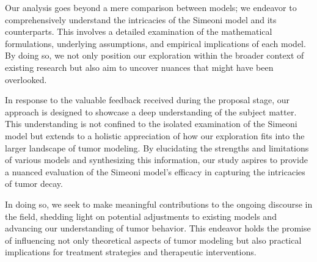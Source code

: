 \documentclass[11pt]{amsart}
\begin{document}
Our analysis goes beyond a mere comparison between models; we endeavor to comprehensively understand the intricacies of the Simeoni model and its counterparts. This involves a detailed examination of the mathematical formulations, underlying assumptions, and empirical implications of each model. By doing so, we not only position our exploration within the broader context of existing research but also aim to uncover nuances that might have been overlooked.

In response to the valuable feedback received during the proposal stage, our approach is designed to showcase a deep understanding of the subject matter. This understanding is not confined to the isolated examination of the Simeoni model but extends to a holistic appreciation of how our exploration fits into the larger landscape of tumor modeling. By elucidating the strengths and limitations of various models and synthesizing this information, our study aspires to provide a nuanced evaluation of the Simeoni model's efficacy in capturing the intricacies of tumor decay.

In doing so, we seek to make meaningful contributions to the ongoing discourse in the field, shedding light on potential adjustments to existing models and advancing our understanding of tumor behavior. This endeavor holds the promise of influencing not only theoretical aspects of tumor modeling but also practical implications for treatment strategies and therapeutic interventions.


\end{document}
